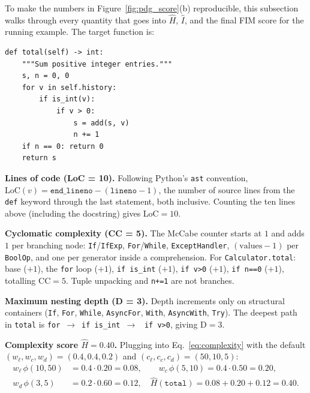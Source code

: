 To make the numbers in Figure~\ref{fig:pdg_score}(b) reproducible, this
subsection walks through every quantity that goes into $\hat{H}$,
$\hat{I}$, and the final FIM score for the running example. The target
function is:

\begin{center}\small
\begin{minipage}{0.78\linewidth}
\begin{verbatim}
def total(self) -> int:
    """Sum positive integer entries."""
    s, n = 0, 0
    for v in self.history:
        if is_int(v):
            if v > 0:
                s = add(s, v)
                n += 1
    if n == 0: return 0
    return s
\end{verbatim}
\end{minipage}
\end{center}

\textbf{Lines of code (LoC = 10).}
Following Python's \texttt{ast} convention,
$\mathrm{LoC}(v)=\texttt{end\_lineno}-(\texttt{lineno}-1)$, the number
of source lines from the \texttt{def} keyword through the last
statement, both inclusive. Counting the ten lines above (including the
docstring) gives $\mathrm{LoC}=10$.

\textbf{Cyclomatic complexity (CC = 5).}
The McCabe counter starts at $1$ and adds $1$ per branching node:
\texttt{If}/\texttt{IfExp}, \texttt{For}/\texttt{While},
\texttt{ExceptHandler}, $(\text{values}{-}1)$ per \texttt{BoolOp}, and
one per generator inside a comprehension. For
\texttt{Calculator.total}: base ($+1$), the \texttt{for} loop ($+1$),
\texttt{if is\_int} ($+1$), \texttt{if v>0} ($+1$), \texttt{if n==0}
($+1$), totalling $\mathrm{CC}=5$. Tuple unpacking and \texttt{n+=1}
are not branches.

\textbf{Maximum nesting depth (D = 3).}
Depth increments only on structural containers (\texttt{If},
\texttt{For}, \texttt{While}, \texttt{AsyncFor}, \texttt{With},
\texttt{AsyncWith}, \texttt{Try}). The deepest path in
\texttt{total} is \texttt{for}~$\to$~\texttt{if is\_int}~$\to$~%
\texttt{if v>0}, giving $\mathrm{D}=3$.

\textbf{Complexity score $\hat{H}=0.40$.}
Plugging into Eq.~\ref{eq:complexity} with the default
$(w_{\ell},w_{c},w_{d})=(0.4,0.4,0.2)$ and
$(c_{\ell},c_{c},c_{d})=(50,10,5)$:
\begin{align*}
w_{\ell}\,\phi(10,50) &= 0.4\!\cdot\!0.20 = 0.08, \qquad
w_{c}\,\phi(5,10)     = 0.4\!\cdot\!0.50 = 0.20, \\
w_{d}\,\phi(3,5)      &= 0.2\!\cdot\!0.60 = 0.12, \quad
\hat{H}(\texttt{total}) = 0.08+0.20+0.12 = 0.40.
\end{align*}

